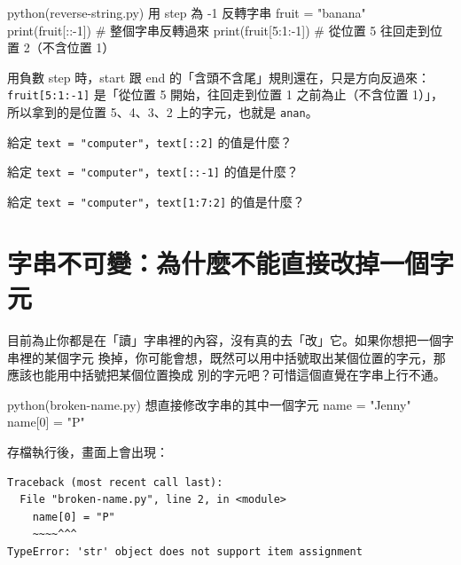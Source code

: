 \begin{example}{python}{(reverse-string.py) 用 step 為 -1 反轉字串}
fruit = "banana"
print(fruit[::-1])       # 整個字串反轉過來
print(fruit[5:1:-1])     # 從位置 5 往回走到位置 2（不含位置 1）
\end{example}


用負數 step 時，start 跟 end 的「含頭不含尾」規則還在，只是方向反過來：
\texttt{fruit[5:1:-1]} 是「從位置 5 開始，往回走到位置 1 之前為止（不含位置 1）」，
所以拿到的是位置 5、4、3、2 上的字元，也就是 \texttt{anan}。


\begin{drills}[label=drills:string-slicing-step]
\item 給定 \texttt{text = "computer"}，\texttt{text[::2]} 的值是什麼？
\item 給定 \texttt{text = "computer"}，\texttt{text[::-1]} 的值是什麼？
\item 給定 \texttt{text = "computer"}，\texttt{text[1:7:2]} 的值是什麼？
\end{drills}

\section{字串不可變：為什麼不能直接改掉一個字元}
\label{sec:string-immutable}

目前為止你都是在「讀」字串裡的內容，沒有真的去「改」它。如果你想把一個字串裡的某個字元
換掉，你可能會想，既然可以用中括號取出某個位置的字元，那應該也能用中括號把某個位置換成
別的字元吧？可惜這個直覺在字串上行不通。

\begin{example}{python}{(broken-name.py) 想直接修改字串的其中一個字元}
name = "Jenny"
name[0] = "P"
\end{example}

存檔執行後，畫面上會出現：

\begin{verbatim}
Traceback (most recent call last):
  File "broken-name.py", line 2, in <module>
    name[0] = "P"
    ~~~~^^^
TypeError: 'str' object does not support item assignment
\end{verbatim}

